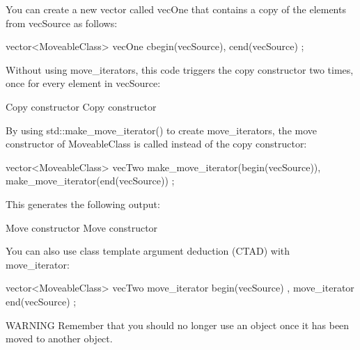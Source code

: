 You can create a new vector called vecOne that contains a copy of the elements from vecSource as follows:

\begin{cpp}
vector<MoveableClass> vecOne { cbegin(vecSource), cend(vecSource) };
\end{cpp}

Without using move\_iterators, this code triggers the copy constructor two times, once for every element in vecSource:

\begin{shell}
Copy constructor
Copy constructor
\end{shell}

By using std::make\_move\_iterator() to create move\_iterators, the move constructor of MoveableClass is called instead of the copy constructor:

\begin{cpp}
vector<MoveableClass> vecTwo { make_move_iterator(begin(vecSource)),
                               make_move_iterator(end(vecSource)) };
\end{cpp}

This generates the following output:

\begin{shell}
Move constructor
Move constructor
\end{shell}

You can also use class template argument deduction (CTAD) with move\_iterator:

\begin{cpp}
vector<MoveableClass> vecTwo { move_iterator { begin(vecSource) },
                               move_iterator { end(vecSource) } };
\end{cpp}

\begin{myWarning}{WARNING}
Remember that you should no longer use an object once it has been moved to another object.
\end{myWarning}














